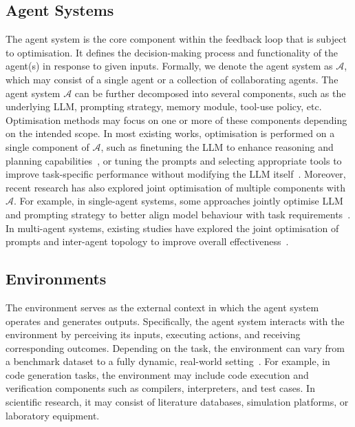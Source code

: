 \documentclass[]{selfevolagent}
\theoremstyle{plain}
\theoremstyle{definition}
\theoremstyle{remark}
\begin{document}
\subsection{Agent Systems} 
The agent system is the core component within the feedback loop that is subject to optimisation. It defines the decision-making process and functionality of the agent(s) in response to given inputs. Formally, we denote the agent system as $\mathcal{A}$, which may consist of a single agent or a collection of collaborating agents. The agent system $\mathcal{A}$ can be further decomposed into several components, such as the underlying LLM, prompting strategy, memory module, tool-use policy, etc. Optimisation methods may focus on one or more of these components depending on the intended scope. In most existing works, optimisation is performed on a single component of $\mathcal{A}$, such as finetuning the LLM to enhance reasoning and planning capabilities~\citep{zelikman2022,tong2024dartmath,lai2024stepdpostepwisepreferenceoptimization}, or tuning the prompts and selecting appropriate tools to improve task-specific performance without modifying the LLM itself~\citep{yang2024large,yuan-etal-2025-easytool}. Moreover, recent research has also explored joint optimisation of multiple components with $\mathcal{A}$. For example, in single-agent systems, some approaches jointly optimise LLM and prompting strategy to better align model behaviour with task requirements~\citep{dilara2024fine}. In multi-agent systems, existing studies have explored the joint optimisation of prompts and inter-agent topology to improve overall effectiveness~\citep{zhang2025aflow,zhou2025multi}. 


\subsection{Environments} 
The environment serves as the external context in which the agent system operates and generates outputs. Specifically, the agent system interacts with the environment by perceiving its inputs, executing actions, and receiving corresponding outcomes. Depending on the task, the environment can vary from a benchmark dataset to a fully dynamic, real-world setting~\citep{liu2023agentbench}. For example, in code generation tasks, the environment may include code execution and verification components such as compilers, interpreters, and test cases. In scientific research, it may consist of literature databases, simulation platforms, or laboratory equipment. 
\end{document}

